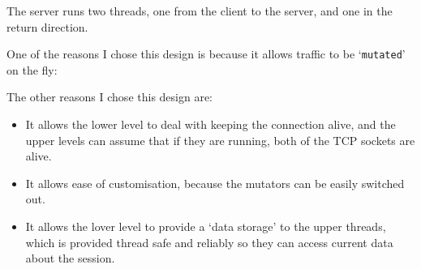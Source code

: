 The server runs two threads, one from the client to the server, and one in the return direction.\par
One of the reasons I chose this design is because it allows traffic to be `\texttt{mutated}' on the fly:
\begin{center}
\end{center}
The other reasons I chose this design are:
\begin{itemize}
    \item It allows the lower level to deal with keeping the connection alive, and the upper levels can assume that if they are running, both of the TCP sockets are alive.
    \item It allows ease of customisation, because the mutators can be easily switched out.
    \item It allows the lover level to provide a `data storage' to the upper threads, which is provided thread safe and reliably so they can access current data about the session.
\end{itemize}

